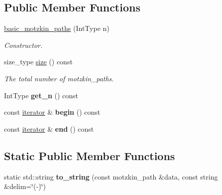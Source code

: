 \subsection*{Public Member Functions}
\begin{DoxyCompactItemize}
\item 
\hyperlink{classdscr_1_1basic__motzkin__paths_a987a2d177105de1c2df2e973093ff53b}{basic\-\_\-motzkin\-\_\-paths} (Int\-Type n)
\begin{DoxyCompactList}\small\item\em Constructor. \end{DoxyCompactList}\item 
size\-\_\-type \hyperlink{classdscr_1_1basic__motzkin__paths_a51f3f118d5aaa81c079d827639d3557a}{size} () const 
\begin{DoxyCompactList}\small\item\em The total number of motzkin\-\_\-paths. \end{DoxyCompactList}\item 
\hypertarget{classdscr_1_1basic__motzkin__paths_a2cde9832f0496cf7e7fb2f75e490cc73}{Int\-Type {\bfseries get\-\_\-n} () const }\label{classdscr_1_1basic__motzkin__paths_a2cde9832f0496cf7e7fb2f75e490cc73}

\item 
\hypertarget{classdscr_1_1basic__motzkin__paths_a31f16bb69beacb46f8eb146bfe92fed5}{const \hyperlink{classdscr_1_1basic__motzkin__paths_1_1iterator}{iterator} \& {\bfseries begin} () const }\label{classdscr_1_1basic__motzkin__paths_a31f16bb69beacb46f8eb146bfe92fed5}

\item 
\hypertarget{classdscr_1_1basic__motzkin__paths_a78d85f017334a36994a2016571f72411}{const \hyperlink{classdscr_1_1basic__motzkin__paths_1_1iterator}{iterator} \& {\bfseries end} () const }\label{classdscr_1_1basic__motzkin__paths_a78d85f017334a36994a2016571f72411}

\end{DoxyCompactItemize}
\subsection*{Static Public Member Functions}
\begin{DoxyCompactItemize}
\item 
\hypertarget{classdscr_1_1basic__motzkin__paths_ad94c386b02725a4c402bc34bc26f1067}{static std\-::string {\bfseries to\-\_\-string} (const motzkin\-\_\-path \&data, const string \&delim=\char`\"{}(-\/)\char`\"{})}\label{classdscr_1_1basic__motzkin__paths_ad94c386b02725a4c402bc34bc26f1067}

\end{DoxyCompactItemize}


